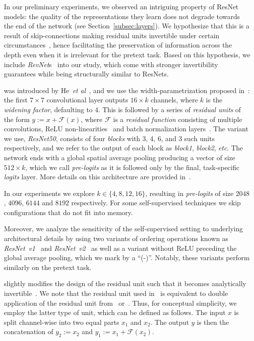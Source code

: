 \documentclass[10pt,twocolumn,letterpaper]{article}
\newcommand{\PAR}[1]{\vskip4pt \noindent {\bf #1~}}
\def\etc{\emph{etc}\onedot} \def\vs{\emph{vs}\onedot}
\def\etal{\emph{et al}\onedot}
\begin{document}
In our preliminary experiments, we observed an intriguing property of ResNet models:
the quality of the representations they learn does not degrade towards the end of the network (see Section~\ref{subsec:layers}).
We hypothesize that this is a result of skip-connections making residual units invertible under certain circumstances~\cite{behrmann2018invertible}, hence facilitating the preservation of information across the depth even when it is irrelevant for the pretext task.
Based on this hypothesis, we include \emph{RevNet}s~\cite{GomezNIPS17} into our study, which come with stronger invertibility guarantees while being structurally similar to ResNets.

\PAR{ResNet} was introduced by He~\etal~\cite{he2016deep}, and we use the width-parametrization proposed in~\cite{zagoruyko2016wide}:
the first $7\times7$ convolutional layer outputs $16 \times k$ channels, where $k$ is the \emph{widening factor}, defaulting to 4.
This is followed by a series of \emph{residual units} of the form $y := x + \mathcal{F}(x)$, where $\mathcal{F}$ is a \emph{residual function} consisting of multiple convolutions, ReLU non-linearities~\cite{nair2010rectified} and batch normalization layers~\cite{ioffe2015batch}.
The variant we use, \emph{ResNet50}, consists of four \emph{blocks} with 3, 4, 6, and 3 such units respectively, and we refer to the output of each block as \emph{block1}, \emph{block2}, \etc.
The network ends with a global spatial average pooling producing a vector of size $512 \times k$, which we call \emph{pre-logits} as it is followed only by the final, task-specific \emph{logits} layer.
More details on this architecture are provided in~\cite{he2016deep}.

In our experiments we explore $k \in \{4, 8, 12, 16\}$, resulting in \emph{pre-logits} of size $2048$, $4096$, $6144$ and $8192$ respectively.
For some self-supervised techniques we skip configurations that do not fit into memory.


Moreover, we analyze the sensitivity of the self-supervised setting to underlying architectural details by using two variants of ordering operations known as \emph{ResNet~v1}~\cite{he2016deep} and \emph{ResNet~v2}~\cite{he2016identity} as well as a variant without ReLU preceding the global average pooling, which we mark by a ``(-)''.
Notably, these variants perform similarly on the pretext task.


\PAR{RevNet} slightly modifies the design of the residual unit such that it becomes analytically invertible~\cite{GomezNIPS17}.
We note that the residual unit used in~\cite{GomezNIPS17} is equivalent to double application of the residual unit from~\cite{JacobsenICLR18} or~\cite{DinhICLR17}.
Thus, for conceptual simplicity, we employ the latter type of unit, which can be defined as follows.
The input $x$ is split channel-wise into two equal parts $x_1$ and $x_2$.
The output $y$ is then the concatenation of $y_2 := x_2$ and $y_1 := x_1 + \mathcal{F}(x_2)$.
\end{document}
